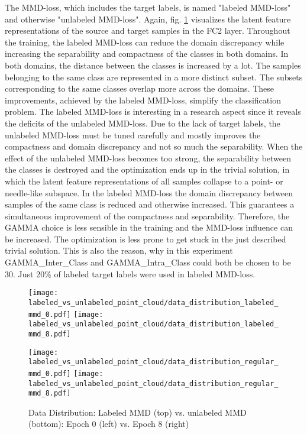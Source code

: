 The MMD-loss, which includes the target labels, is named "labeled MMD-loss" and otherwise "unlabeled MMD-loss". Again, fig. \ref{fig:point_cloud_labeled_unlabeled_mmd} visualizes the latent feature representations of the source and target samples in the FC2 layer. Throughout the training, the labeled MMD-loss can reduce the domain discrepancy while increasing the separability and compactness of the classes in both domains. In both domains, the distance between the classes is increased by a lot. The samples belonging to the same class are represented in a more distinct subset. The subsets corresponding to the same classes overlap more across the domains. These improvements, achieved by the labeled MMD-loss, simplify the classification problem. The labeled MMD-loss is interesting in a research aspect since it reveals the deficits of the unlabeled MMD-loss. Due to the lack of target labels, the unlabeled MMD-loss must be tuned carefully and mostly improves the compactness and domain discrepancy and not so much the separability. When the effect of the unlabeled MMD-loss becomes too strong, the separability between the classes is destroyed and the optimization ends up in the trivial solution, in which the latent feature representations of all samples collapse to a point- or needle-like subspace. In the labeled MMD-loss the domain discrepancy between samples of the same class is reduced and otherwise increased. This guarantees a simultaneous improvement of the compactness and separability. Therefore, the GAMMA choice is less sensible in the training and the MMD-loss influence can be increased. The optimization is less prone to get stuck in the just described trivial solution. This is also the reason, why in this experiment GAMMA\_Inter\_Class and GAMMA\_Intra\_Class could both be chosen to be 30. Just 20\% of labeled target labels were used in labeled MMD-loss.

\begin{figure}[htp]
  \centering
  \texttt{[image: labeled\_vs\_unlabeled\_point\_cloud/data\_distribution\_labeled\_mmd\_0.pdf]}
  \hspace{.4cm}
  \texttt{[image: labeled\_vs\_unlabeled\_point\_cloud/data\_distribution\_labeled\_mmd\_8.pdf]}

  \vspace{.1cm}

  \texttt{[image: labeled\_vs\_unlabeled\_point\_cloud/data\_distribution\_regular\_mmd\_0.pdf]}
  \hspace{.4cm}
  \texttt{[image: labeled\_vs\_unlabeled\_point\_cloud/data\_distribution\_regular\_mmd\_8.pdf]}
  
  \caption{Data Distribution: Labeled MMD (top) vs. unlabeled MMD (bottom): Epoch 0 (left) vs. Epoch 8 (right)}
  \label{fig:point_cloud_labeled_unlabeled_mmd}
\end{figure}

